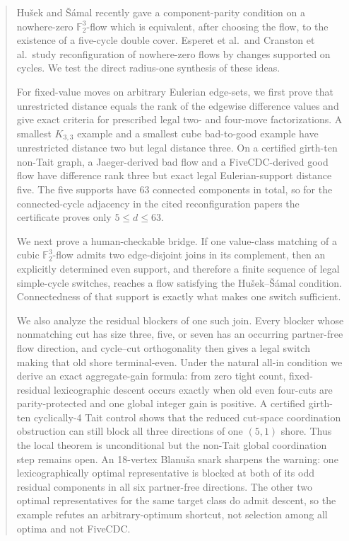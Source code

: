 \documentclass[11pt]{article}
\theoremstyle{definition}
\theoremstyle{remark}
\newcommand{\F}{\mathbb F}
\numberwithin{equation}{section}
\begin{document}
\begin{abstract}
Hu\v{s}ek and \v{S}\'amal recently gave a component-parity condition on
a nowhere-zero \(\F_2^3\)-flow which is equivalent, after choosing the
flow, to the existence of a five-cycle double cover.  Esperet et al.\
and Cranston et al.\ study reconfiguration of nowhere-zero flows by
changes supported on cycles.  We test the direct radius-one synthesis
of these ideas.

For fixed-value moves on arbitrary Eulerian edge-sets, we first prove
that unrestricted distance equals the rank of the edgewise difference
values and give exact criteria for prescribed legal two- and four-move
factorizations.  A
smallest \(K_{3,3}\) example and a smallest cube bad-to-good example have
unrestricted distance two but legal distance three.  On a certified
girth-ten non-Tait graph, a Jaeger-derived bad flow and a
FiveCDC-derived good flow have difference rank three but exact legal
Eulerian-support distance five.  The five supports have 63 connected
components in total, so for the connected-cycle adjacency in the cited
reconfiguration papers the certificate proves only
\(5\leq d\leq63\).

We next prove a human-checkable bridge.  If one value-class matching of
a cubic \(\F_2^3\)-flow admits two edge-disjoint joins in its complement,
then an explicitly determined even support, and therefore a finite
sequence of legal simple-cycle switches, reaches a flow satisfying the
Hu\v{s}ek--\v{S}\'amal condition.  Connectedness of that support is
exactly what makes one switch sufficient.

We also analyze the residual blockers of one such join.  Every blocker
whose nonmatching cut has size three, five, or seven has an occurring
partner-free flow direction, and cycle--cut orthogonality then gives a
legal switch making that old shore terminal-even.  Under the natural
all-in condition we derive an exact aggregate-gain formula: from zero
tight count, fixed-residual lexicographic descent occurs exactly when old
even four-cuts are parity-protected and one global integer gain is
positive.  A certified girth-ten cyclically-4 Tait control shows that the
reduced cut-space coordination obstruction can still block all three
directions of one \((5,1)\) shore.  Thus the local theorem is unconditional
but the non-Tait global coordination step remains open.
An 18-vertex Blanu\v{s}a snark sharpens the warning: one
lexicographically optimal representative is blocked at both of its odd
residual components in all six partner-free directions.  The other two
optimal representatives for the same target class do admit descent, so
the example refutes an arbitrary-optimum shortcut, not selection among
all optima and not FiveCDC.


\end{abstract}
\end{document}
